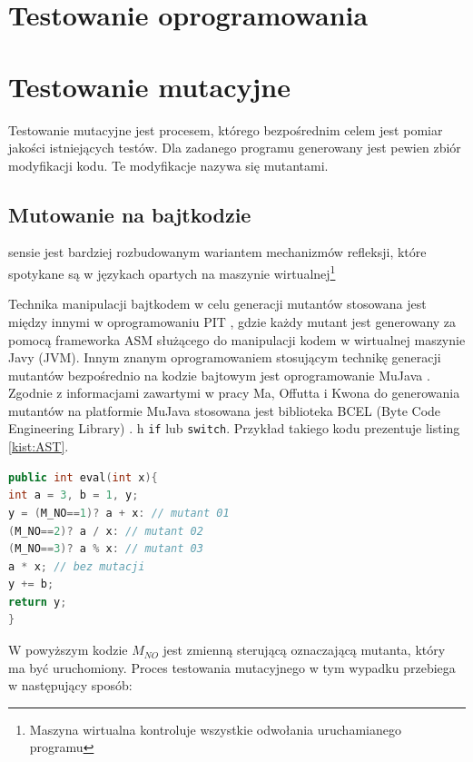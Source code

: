 \documentclass[11pt,a4paper,oldfontcommands]{memoir}
\theoremstyle{plain}
\theoremstyle{definition}
\theoremstyle{remark}
\begin{document}
\chapter{Testowanie oprogramowania \label{WhatisTestingChapter}} 


\chapter{Testowanie mutacyjne\label{sec:mutation}}
Testowanie mutacyjne jest procesem, którego bezpośrednim celem jest pomiar jakości istniejących testów. Dla zadanego programu generowany jest pewien zbiór modyfikacji kodu. Te modyfikacje nazywa się mutantami.

\section{Mutowanie na bajtkodzie}

sensie jest bardziej rozbudowanym wariantem mechanizmów refleksji, które spotykane są w językach opartych na maszynie wirtualnej\footnote{Maszyna wirtualna kontroluje wszystkie odwołania uruchamianego programu }

Technika manipulacji bajtkodem w celu generacji mutantów stosowana jest między innymi w oprogramowaniu PIT \cite{PIT}, gdzie każdy mutant jest generowany za pomocą frameworka ASM \cite{ASM} służącego do manipulacji kodem w wirtualnej maszynie Javy (JVM). Innym znanym oprogramowaniem stosującym technikę generacji mutantów bezpośrednio na kodzie bajtowym jest oprogramowanie MuJava \cite{Mujava}. Zgodnie z informacjami zawartymi w pracy  Ma, Offutta i Kwona \cite{MuJavadoc} do generowania mutantów na platformie MuJava stosowana jest biblioteka BCEL (Byte Code Engineering Library) \cite{bcel}. 
h \texttt{if} lub \texttt{switch}. Przykład takiego kodu prezentuje listing  \ref{kist:AST}.



\newpage
\begin{lstlisting}[language=C++, caption={Pseudokod opisujący mechanikę optymalizacji polegającej na generowaniu wielu mutantów w jednej kompilacji},label={kist:AST}]
public int eval(int x){
int a = 3, b = 1, y;
y = (M_NO==1)? a + x: // mutant 01
(M_NO==2)? a / x: // mutant 02
(M_NO==3)? a % x: // mutant 03
a * x; // bez mutacji
y += b;
return y;
}
\end{lstlisting}

W powyższym kodzie $M_{NO}$ jest zmienną sterującą oznaczającą mutanta, który ma być uruchomiony. Proces testowania mutacyjnego w tym wypadku przebiega w następujący sposób: 
\end{document}
